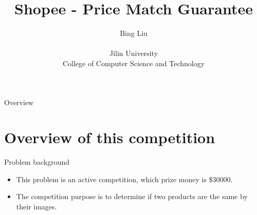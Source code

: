 \documentclass[
 size=14pt,
 paper=smartboard,  %
 mode=present, 		%
 display=slides, 	%
 style=tuliplab,  	%
 pauseslide,
 fleqn,leqno]{powerdot}
\title{Shopee - Price Match Guarantee}
\author{
Bing Liu
\\
\\Jilin University
\\College of Computer Science and Technology
}
\date{\gitCommitterDate}
\begin{document}
\maketitle



\begin{slide}[toc=,bm=]{Overview}
\tableofcontents[content=currentsection,type=1]
\end{slide}


\section{Overview of this competition}

\begin{slide}{Problem background}

\begin{itemize}
\item This problem is an active competition, which prize money is \$30000. %

\bigskip

\item The competition purpose is to determine if two products are the same by their images.
\end{itemize}

\end{slide}
\end{document}
